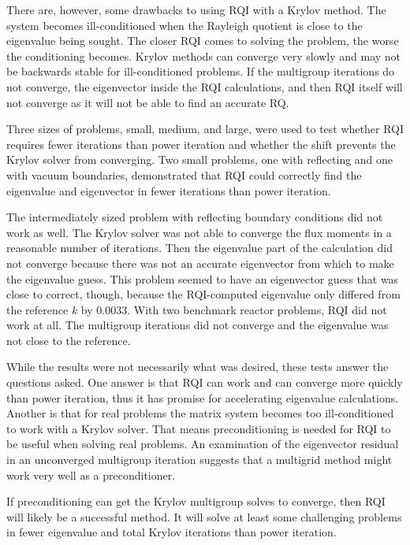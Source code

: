 There are, however, some drawbacks to using RQI with a Krylov method. The system becomes ill-conditioned when the Rayleigh quotient is close to the eigenvalue being sought. The closer RQI comes to solving the problem, the worse the conditioning becomes. Krylov methods can converge very slowly and may not be backwards stable for ill-conditioned problems. If the multigroup iterations do not converge, the eigenvector inside the RQI calculations, and then RQI itself will not converge as it will not be able to find an accurate RQ.

Three sizes of problems, small, medium, and large, were used to test whether RQI requires fewer iterations than power iteration and whether the shift prevents the Krylov solver from converging. Two small problems, one with reflecting and one with vacuum boundaries, demonstrated that RQI could correctly find the eigenvalue and eigenvector in fewer iterations than power iteration. 

The intermediately sized problem with reflecting boundary conditions did not work as well. The Krylov solver was not able to converge the flux moments in a reasonable number of iterations. Then the eigenvalue part of the calculation did not converge because there was not an accurate eigenvector from which to make the eigenvalue guess. This problem seemed to have an eigenvector guess that was close to correct, though, because the RQI-computed eigenvalue only differed from the reference $k$ by 0.0033. With two benchmark reactor problems, RQI did not work at all. The multigroup iterations did not converge and the eigenvalue was not close to the reference. 

While the results were not necessarily what was desired, these tests answer the questions asked. One answer is that RQI can work and can converge more quickly than power iteration, thus it has promise for accelerating eigenvalue calculations. Another is that for real problems the matrix system becomes too ill-conditioned to work with a Krylov solver. That means preconditioning is needed for RQI to be useful when solving real problems. An examination of the eigenvector residual in an unconverged multigroup iteration suggests that a multigrid method might work very well as a preconditioner. 

If preconditioning can get the Krylov multigroup solves to converge, then RQI will likely be a successful method. It will solve at least some challenging problems in fewer eigenvalue and total Krylov iterations than power iteration. 

